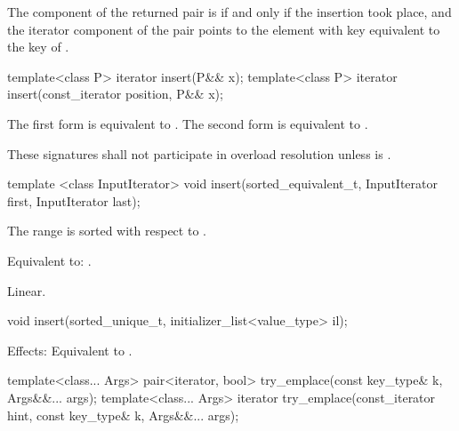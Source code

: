 \begin{codeblock}
\begin{codeblock}
\begin{codeblock}
\begin{addedblock}
\begin{itemdescr}
\pnum
\returns
The  component of the returned pair is  if and only if
the insertion took place, and the iterator component of the pair points to the
element with key equivalent to the key of .
\end{itemdescr}

%
\begin{itemdecl}
template<class P> iterator insert(P&& x);
template<class P> iterator insert(const_iterator position, P&& x);
\end{itemdecl}

\begin{itemdescr}
\pnum
\effects
The first form is equivalent to
. The second form is
equivalent to .

\pnum
\remarks
These signatures shall not participate in overload resolution
unless  is
.
\end{itemdescr}

%
\begin{itemdecl}
template <class InputIterator>
  void insert(sorted_equivalent_t, InputIterator first, InputIterator last);
\end{itemdecl}

\begin{itemdescr}
\pnum \expects
The range  is sorted with respect to .

\pnum \effects Equivalent to: .

\pnum \complexity Linear.
\end{itemdescr}

%
\begin{itemdecl}
void insert(sorted_unique_t, initializer_list<value_type> il);
\end{itemdecl}

\begin{itemdescr}
\pnum Effects: Equivalent to .
\end{itemdescr}

%
\begin{itemdecl}
template<class... Args>
  pair<iterator, bool> try_emplace(const key_type& k, Args&&... args);
template<class... Args>
  iterator try_emplace(const_iterator hint, const key_type& k, Args&&... args);
\end{itemdecl}


\end{addedblock}
\end{codeblock}
\end{codeblock}
\end{codeblock}
